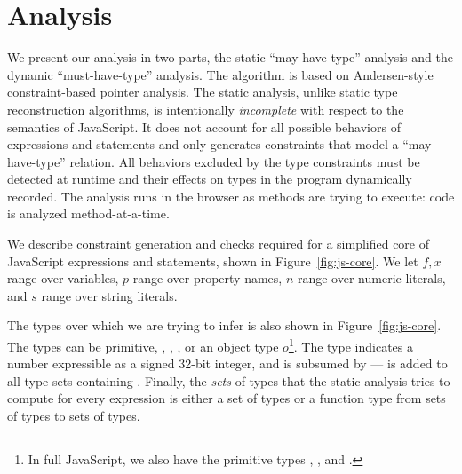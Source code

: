\section{Analysis}

We present our analysis in two parts, the static ``may-have-type'' analysis
and the dynamic ``must-have-type'' analysis. The algorithm is based on
Andersen-style constraint-based pointer analysis. The static analysis, unlike
static type reconstruction algorithms, is intentionally \textit{incomplete}
with respect to the semantics of JavaScript. It does not account for all
possible behaviors of expressions and statements and only generates
constraints that model a ``may-have-type'' relation. All behaviors excluded by
the type constraints must be detected at runtime and their effects on types in
the program dynamically recorded. The analysis runs in the browser as methods
are trying to execute: code is analyzed method-at-a-time.

%
%
%
%
%
%

We describe constraint generation and checks required for a simplified core of
JavaScript expressions and statements, shown in Figure~\ref{fig:js-core}. We
let $f,x$ range over variables, $p$ range over property names, $n$ range over
numeric literals, and $s$ range over string literals.

The types over which we are trying to infer is also shown in
Figure~\ref{fig:js-core}. The types can be primitive, ,
, , or an object type $o$\footnote{In full
  JavaScript, we also have the primitive types , , and
  .}. The  type indicates a number expressible as a
signed 32-bit integer, and is subsumed by  ---  is
added to all type sets containing . Finally, the \emph{sets} of
types that the static analysis tries to compute for every expression is either
a set of types or a function type from sets of types to sets of types.

